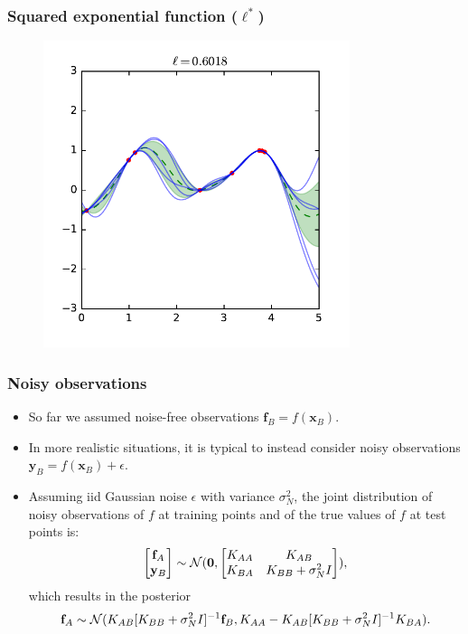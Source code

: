 \documentclass{beamer}
\begin{document}
\begin{frame}
    \frametitle{Squared exponential function ($\ell^*$)}

    \begin{figure}
        \centering
        \includegraphics[width=0.8\textwidth]{./figures/rbf-ml.pdf}
    \end{figure}
\end{frame}


\begin{frame}
    \frametitle{Noisy observations}

    \begin{itemize}
        \item So far we assumed noise-free observations $\mathbf{f}_B = f(\mathbf{x}_B)$.
        \item In more realistic situations, it is typical to instead consider noisy observations $\mathbf{y}_B = f(\mathbf{x}_B) + \epsilon$.
        \item Assuming iid Gaussian noise $\epsilon$ with variance $\sigma^2_N$, the joint distribution of noisy observations of $f$ at training points and of the true values of $f$ at test points is:
        $$\begin{bmatrix}\mathbf{f}_A\\
                         \mathbf{y}_B\end{bmatrix} \sim {\cal N}(\mathbf{0}, \begin{bmatrix}K_{AA} & K_{AB} \\
                                                                                            K_{BA} & K_{BB} + \sigma^2_N I\end{bmatrix}),$$
        which results in the posterior
        $$\mathbf{f}_A \sim {\cal N}(K_{AB}[K_{BB} + \sigma^2_N I]^{-1}{\mathbf{f}_B}, K_{AA} - K_{AB}[K_{BB} + \sigma^2_N I]^{-1}K_{BA}).$$
    \end{itemize}

\end{frame}
\end{document}
